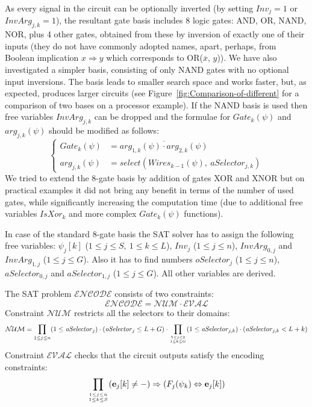As every signal in the circuit can be optionally inverted (by setting
$\mathit{Inv}_{j}=1$ or $\mathit{InvArg}_{j,k}=1$), the resultant
gate basis includes 8 logic gates: AND, OR, NAND, NOR, plus 4 other
gates, obtained from these by inversion of exactly one of their inputs
(they do not have commonly adopted names, apart, perhaps, from Boolean
implication $x\Rightarrow y$ which corresponds to OR($\overline{x}$,
$y$)). We have also investigated a simpler basis, consisting of only
NAND gates with no optional input inversions. The basis leads to smaller
search space and works faster, but, as expected, produces larger circuits
(see Figure~\ref{fig:Comparison-of-different} for a comparison of
two bases on a processor example). If the NAND basis is used then
free variables $\mathit{InvArg}_{j,k}$ can be dropped and the formulae
for $\mathit{Gate}_{k}(\psi)$ and $\mathit{arg}_{j,k}(\psi)$ should
be modified as follows: 
\[
\begin{cases}
\mathit{Gate}_{k}(\psi) & =\overline{\mathit{arg}_{1,k}(\psi)\cdot\mathit{arg}_{2,k}(\psi)}\\
\mathit{arg}_{j,k}(\psi) & =select(\mathit{Wires}_{k-1}(\psi),\ \mathit{aSelector}_{j,k})
\end{cases}
\]
We tried to extend the 8-gate basis by addition of gates XOR and XNOR
but on practical examples it did not bring any benefit in terms of
the number of used gates, while significantly increasing the computation
time (due to additional free variables $\mathit{IsXor_{k}}$ and more
complex $\mathit{Gate}_{k}(\psi)$ functions).

In case of the standard 8-gate basis the SAT solver has to assign
the following free variables: $\psi_{j}[k]$ ($1\le j\le S,\ 1\le k\le L$),
$Inv_{j}$ ($1\le j\le n$), $\mathit{InvArg}_{0,j}$ and $\mathit{InvArg}_{1,j}$
($1\le j\le G$). Also it has to find numbers $\mathit{oSelector}_{j}$
($1\le j\le n$), $\mathit{aSelector}_{0,j}$ and $\mathit{aSelector}_{1,j}$
($1\le j\le G$). All other variables are derived.

The SAT problem $\mathcal{ENCODE}$ consists of two constraints:
\[
\mathcal{ENCODE}=\mathcal{NUM}\cdot\mathcal{EVAL}
\]
 Constraint $\mathcal{NUM}$ restricts all the selectors to their
domains:
\[
\mathcal{NUM}=\prod_{1\le j\le n}(1\le\mathit{oSelector}_{j})\cdot(\mathit{oSelector}_{j}\le L+G)\cdot\prod_{{1\le j\le2\atop 1\le k\le G}}(1\le\mathit{aSelector}_{j,k})\cdot(\mathit{aSelector}_{j,k}<L+k)
\]
Constraint $\mathcal{EVAL}$ checks that the circuit outputs satisfy
the encoding constraints:
\[
\prod_{{1\le j\le n\atop 1\le k\le S}}(\mathbf{e}_{j}[k]\neq-)\Rightarrow(F_{j}(\psi_{k})\Leftrightarrow\mathbf{e}_{j}[k])
\]


